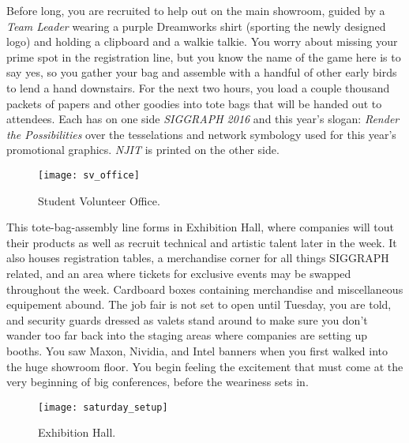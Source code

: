 \documentclass[../main.tex]{subfiles}
\begin{document}
Before long, you are recruited to help out on the main showroom, guided by a \textit{Team Leader} wearing a purple Dreamworks shirt (sporting the newly designed logo) and holding a clipboard and a walkie talkie. You worry about missing your prime spot in the registration line, but you know the name of the game here is to say yes, so you gather your bag and assemble with a handful of other early birds to lend a hand downstairs. For the next two hours, you load a couple thousand packets of papers and other goodies into tote bags that will be handed out to attendees. Each has on one side \textit{SIGGRAPH 2016} and this year's slogan: \textit{Render the Possibilities} over the tesselations and network symbology used for this year's promotional graphics. \textit{NJIT} is printed on the other side.

\begin{figure}[h]
	\centering
	\texttt{[image: sv\_office]}
	\caption*{Student Volunteer Office.}
\end{figure}

This tote-bag-assembly line forms in Exhibition Hall, where companies will tout their products as well as recruit technical and artistic talent later in the week. It also houses registration tables, a merchandise corner for all things SIGGRAPH related, and an area where tickets for exclusive events may be swapped throughout the week. Cardboard boxes containing merchandise and miscellaneous equipement abound. The job fair is not set to open until Tuesday, you are told, and security guards dressed as valets stand around to make sure you don't wander too far back into the staging areas where companies are setting up booths. You saw Maxon, Nividia, and Intel banners when you first walked into the huge showroom floor. You begin feeling the excitement that must come at the very beginning of big conferences, before the weariness sets in.

\begin{figure}[h]
	\centering
	\texttt{[image: saturday\_setup]}
	\caption*{Exhibition Hall.}
\end{figure}
\end{document}
